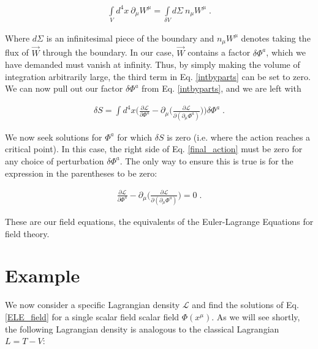 \documentclass[10pt]{article}
\begin{document}
               		\begin{align}\label{divtheorem}
               		    \int\limits_{V} d^4x \: \partial_\mu W^\mu = \int\limits_{\delta V} d\Sigma \: n_\mu W^\mu \; .
               		\end{align}
               		
               		Where $d\Sigma$ is an infinitesimal piece of the boundary and $n_\mu W^\mu$ denotes taking the flux of $\vec{W}$ through the boundary. In our case, $\vec{W}$ contains a factor $\delta \Phi^a$, which we have demanded must vanish at infinity. Thus, by simply making the volume of integration arbitrarily large, the third term in Eq. \ref{intbyparts} can be set to zero. We can now pull out our factor $\delta \Phi^a$ from Eq. \ref{intbyparts}, and we are left with
               		
               	    \begin{align}\label{final_action}
               	        \delta S = \int d^4x \bigg( \frac{\partial \mathcal{L}}{\partial \Phi^a} - \partial_\mu \bigg( \frac{\partial \mathcal{L}}{\partial (\partial_\mu \Phi^a)} \bigg) \bigg) \delta \Phi^a \; .
               	    \end{align}
               		
               		We now seek solutions for $\Phi^a$ for which $\delta S$ is zero (i.e. where the action reaches a critical point). In this case, the right side of Eq. \ref{final_action} must be zero for any choice of perturbation $\delta \Phi^a$. The only way to ensure this is true is for the expression in the parentheses to be zero:
               		
               		\begin{align}\label{ELE_field}
               		\frac{\partial \mathcal{L}}{\partial \Phi^a} - \partial_\mu \bigg( \frac{\partial \mathcal{L}}{\partial (\partial_\mu \Phi^a)} \bigg) = 0 \; .
               		\end{align}
               		
               		These are our field equations, the equivalents of the Euler-Lagrange Equations for field theory.
               		
               	\section{Example}\label{sec:best_prac}
               	We now consider a specific Lagrangian density $\mathcal{L}$ and find the solutions of Eq. \ref{ELE_field} for a single scalar field scalar field $\Phi(x^\mu)$. As we will see shortly, the following Lagrangian density is analogous to the classical Lagrangian $L = T - V$:
               	
\end{document}
